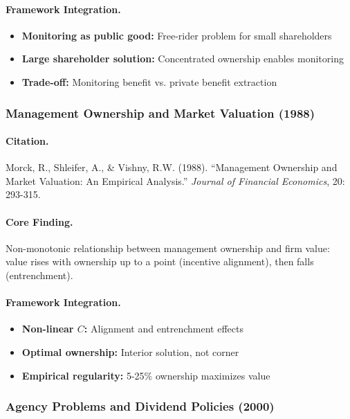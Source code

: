 \paragraph{Framework Integration.}
\begin{itemize}
  \item \textbf{Monitoring as public good:} Free-rider problem for small shareholders
  \item \textbf{Large shareholder solution:} Concentrated ownership enables monitoring
  \item \textbf{Trade-off:} Monitoring benefit vs. private benefit extraction
\end{itemize}

\subsubsection{Management Ownership and Market Valuation (1988)}

\paragraph{Citation.}
Morck, R., Shleifer, A., \& Vishny, R.W. (1988).
``Management Ownership and Market Valuation: An Empirical Analysis.''
\emph{Journal of Financial Economics}, 20: 293-315.

\paragraph{Core Finding.}
Non-monotonic relationship between management ownership and firm value:
value rises with ownership up to a point (incentive alignment), then
falls (entrenchment).

\paragraph{Framework Integration.}
\begin{itemize}
  \item \textbf{Non-linear $C$:} Alignment and entrenchment effects
  \item \textbf{Optimal ownership:} Interior solution, not corner
  \item \textbf{Empirical regularity:} 5-25\% ownership maximizes value
\end{itemize}

\subsubsection{Agency Problems and Dividend Policies (2000)}

